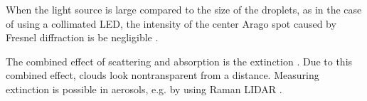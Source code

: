 When the light source is large compared to the size of the droplets, as in the case of using a collimated LED, the intensity of the center Arago spot caused by Fresnel diffraction is be negligible \cite{reis2017}.

The combined effect of scattering and absorption is the extinction \cite{bohr2008}. Due to this combined effect, clouds look nontransparent from a distance. Measuring extinction is possible in aerosols, e.g. by using Raman LIDAR \cite{ans1990}.

